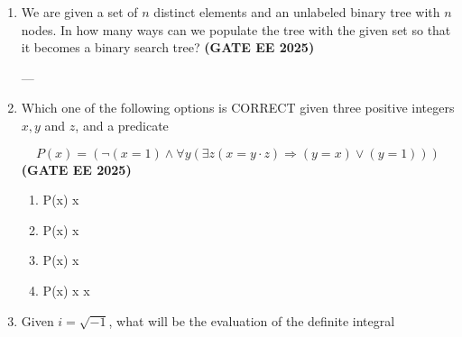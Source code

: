 \documentclass[journal,12pt,onecolumn]{IEEEtran}
\theoremstyle{remark}
\begin{document}
\begin{enumerate}
\begin{enumerate}
\end{enumerate}



\item We are given a set of $n$ distinct elements and an unlabeled binary tree with $n$ nodes. In how many ways can we populate the tree with the given set so that it becomes a binary search tree?  \hfill \textbf{(GATE EE 2025)}

\begin{enumerate}
\end{enumerate}

---

\item Which one of the following options is CORRECT given three positive integers $x, y$ and $z$, and a predicate  

\[
P(x) = (\neg(x=1) \wedge \forall y (\exists z (x = y \cdot z) \Rightarrow (y = x) \vee (y=1)))
\]
\hfill \textbf{(GATE EE 2025)}
\begin{enumerate}
\item  P(x)  x 

\item  P(x)  x 


\item  P(x)  x

\item  P(x)  x  x


\end{enumerate}


\item Given $i = \sqrt{-1}$, what will be the evaluation of the definite integral  


\end{enumerate}
\end{document}
